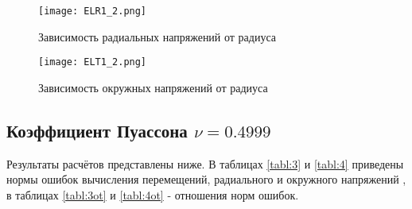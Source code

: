 \documentclass[a4paper,14pt]{extarticle}
\begin{document}
\newpage
\begin{figure}[h]
\begin{center}
\texttt{[image: ELR1\_2.png]}
\caption{Зависимость радиальных напряжений от радиуса}
\label{1r}
\end{center}
\end{figure}

\begin{figure}[h]
\begin{center}
\texttt{[image: ELT1\_2.png]}
\caption{Зависимость окружных напряжений от радиуса}
\label{1t}
\end{center}
\end{figure}

\newpage

	\subsection{Коэффициент Пуассона $\nu=0.4999$}
	
Результаты расчётов представлены ниже. В таблицах \ref{tabl:3} и \ref{tabl:4} приведены нормы ошибок вычисления перемещений, радиального и окружного напряжений , в таблицах \ref{tabl:3ot} и \ref{tabl:4ot} - отношения норм ошибок.
\end{document}
